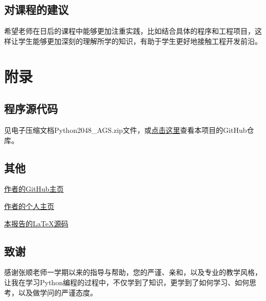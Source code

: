 \documentclass[UTF8,AutoFakeBold,AutoFakeSlant,zihao=-4]{ctexart}
\begin{document}
\subsection{对课程的建议}
希望老师在日后的课程中能够更加注重实践，比如结合具体的程序和工程项目，这样让学生能够更加深刻的理解所学的知识，有助于学生更好地接触工程开发前沿。


\clearpage
\section{附录}
\subsection{程序源代码}

见电子压缩文档Python2048\_AGS.zip文件，或\href{https://github.com/guanshuao/Python2048/}{点击这里}查看本项目的GitHub仓库。

\subsection{其他}

\href{https://github.com/guanshuao}{作者的GitHub主页}

\href{https://guanshuao.github.io/}{作者的个人主页}

\href{https://github.com/guanshuao/Python2048/tree/main/Report}{本报告的LaTeX源码}

\subsection{致谢}

感谢张顺老师一学期以来的指导与帮助，您的严谨、亲和，以及专业的教学风格，让我在学习Python编程的过程中，不仅学到了知识，更学到了如何学习、如何思考，以及做学问的严谨态度。
\end{document}
